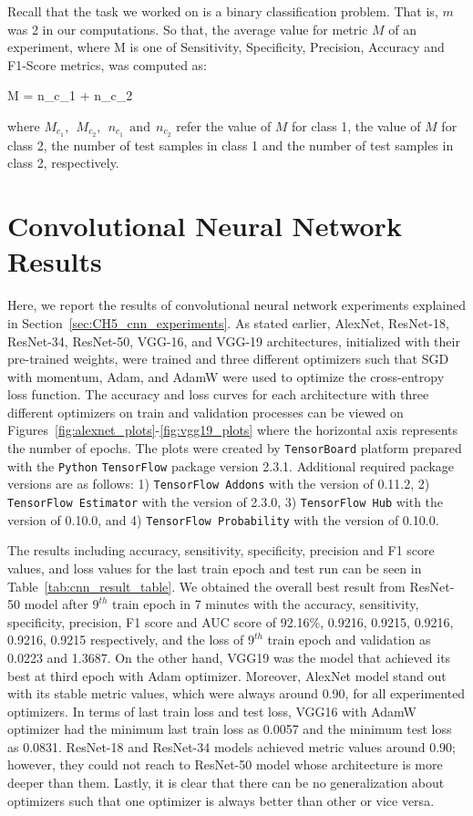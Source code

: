 Recall that the task we worked on is a binary classification problem. That is, $m$ was 2 in our computations. So that, the average value for metric $M$ of an experiment, where M is one of Sensitivity, Specificity, Precision, Accuracy and F1-Score metrics, was computed as:

\be
\label{eq:weighted_avg_binary_class_metric}
M =  {n_{c_{1}} + n_{c_{2}}} \:\: \raisepunct{,}
\ee

where $M_{c_{1}},\:\:M_{c_{2}},\:\:n_{c_{1}}\:\:\text{and}\:\:n_{c_{2}}$ refer the value of $M$ for class 1, the value of $M$ for class 2, the number of test samples in class 1 and the number of test samples in class 2, respectively.

\section{Convolutional Neural Network Results}

Here, we report the results of convolutional neural network experiments explained in Section~\ref{sec:CH5_cnn_experiments}. As stated earlier, AlexNet, ResNet-18, ResNet-34, ResNet-50, VGG-16, and VGG-19 architectures, initialized with their pre-trained weights, were trained and three different optimizers such that SGD with momentum, Adam, and AdamW were used to optimize the cross-entropy loss function. The accuracy and loss curves for each architecture with three different optimizers on train and validation processes can be viewed on Figures~\ref{fig:alexnet_plots}-\ref{fig:vgg19_plots} where the horizontal axis represents the number of epochs. The plots were created by \verb|TensorBoard| platform prepared with the \verb|Python| \verb|TensorFlow| package version 2.3.1. Additional required package versions are as follows: 1) \verb|TensorFlow Addons| with the version of 0.11.2, 2) \verb|TensorFlow Estimator| with the version of 2.3.0, 3) \verb|TensorFlow Hub| with the version of 0.10.0, and 4) \verb|TensorFlow Probability| with the version of 0.10.0.

The results including accuracy, sensitivity, specificity, precision and F1 score values, and loss values for the last train epoch and test run can be seen in Table~\ref{tab:cnn_result_table}. We obtained the overall best result from ResNet-50 model after $9^{th}$ train epoch in 7 minutes with the accuracy, sensitivity, specificity, precision, F1 score and AUC score of 92.16\%, 0.9216, 0.9215, 0.9216, 0.9216, 0.9215 respectively, and the loss of $9^{th}$ train epoch and validation as 0.0223 and 1.3687. On the other hand, VGG19 was the model that achieved its best at third epoch with Adam optimizer. Moreover, AlexNet model stand out with its stable metric values, which were always around 0.90, for all experimented optimizers. In terms of last train loss and test loss, VGG16 with AdamW optimizer had the minimum last train loss as 0.0057 and the minimum test loss as 0.0831. ResNet-18 and ResNet-34 models achieved metric values around 0.90; however, they could not reach to ResNet-50 model whose architecture is more deeper than them. Lastly, it is clear that there can be no generalization about optimizers such that one optimizer is always better than other or vice versa.
 
